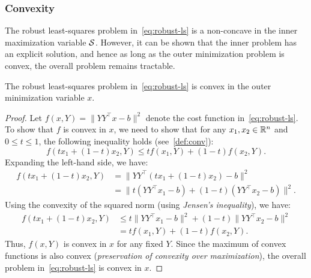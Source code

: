 \subsubsection{Convexity}
The robust least-squares problem in~\eqref{eq:robust-ls} is a non-concave in the inner maximization variable $\mathcal{S}$. However, it can be shown that the inner problem has an explicit solution, and hence as long as the outer minimization problem is convex, the overall problem remains tractable.
\begin{lemma}
    The robust least-squares problem in~\eqref{eq:robust-ls} is convex in the outer minimization variable $x$.
    \begin{proof}
        Let $f(x,Y) = \lVert YY^\top x - b \rVert^2$ denote the cost function in~\eqref{eq:robust-ls}. To show that $f$ is convex in $x$, we need to show that for any $x_1, x_2 \in \mathbb{R}^n$ and $0 \leq t \leq 1$, the following inequality holds (see~\ref{def:conv}):
        \[
            f(t x_1 + (1-t)x_2, Y) \leq t f(x_1, Y) + (1-t) f(x_2, Y).
        \]
        Expanding the left-hand side, we have:
        \begin{equation*}
        \begin{split}
            f(t x_1 + (1-t)x_2, Y) &= \lVert Y Y^\top (t x_1 + (1-t)x_2) - b \rVert^2 \\
            &= \lVert t (Y Y^\top x_1 - b) + (1-t)(Y Y^\top x_2 - b) \rVert^2.
        \end{split}
        \end{equation*}
        Using the convexity of the squared norm (using \emph{Jensen's inequality}), we have:
        \begin{equation*}
        \begin{split}
            f(t x_1 + (1-t)x_2, Y) &\leq t \lVert Y Y^\top x_1 - b \rVert^2 + (1-t) \lVert Y Y^\top x_2 - b \rVert^2 \\
            &= t f(x_1, Y) + (1-t) f(x_2, Y).
        \end{split}
        \end{equation*}
        Thus, $f(x,Y)$ is convex in $x$ for any fixed $Y$. Since the maximum of convex functions is also convex (\emph{preservation of convexity over maximization}), the overall problem in~\eqref{eq:robust-ls} is convex in $x$.
    \end{proof}
\end{lemma}


